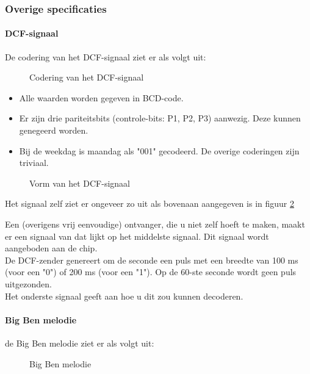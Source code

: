 \subsubsection{Overige specificaties}

\paragraph{DCF-signaal}

De codering van het DCF-signaal ziet er als volgt uit:

\begin{figure}[bth]
\centerline{}
\caption{Codering van het DCF-signaal}
\label{dcfcode}
\end{figure}

\begin{itemize}
\item
Alle waarden worden gegeven in BCD-code.
\item
Er zijn drie pariteitsbits (controle-bits: P1, P2, P3) aanwezig. Deze kunnen 
genegeerd worden.
\item
Bij de weekdag is maandag als "001" gecodeerd. De overige coderingen zijn 
triviaal.
\end{itemize}
\begin{figure}[bth]
\centerline{}
\caption{Vorm van het DCF-signaal}
\label{dcfsignaal}
\end{figure}


Het signaal zelf ziet er ongeveer zo uit als bovenaan aangegeven is in figuur 
\ref{dcfsignaal}

Een (overigens vrij eenvoudige) ontvanger, die u niet zelf hoeft te maken, maakt
 er een signaal van dat lijkt op het middelste signaal. Dit signaal wordt 
aangeboden aan de chip.\\
De DCF-zender genereert om de seconde een puls
met een breedte van 100 ms (voor een "0") of 200 ms (voor een "1").
Op de 60-ste seconde wordt geen puls uitgezonden.\\
Het onderste signaal geeft aan hoe u dit zou kunnen decoderen.

\paragraph{Big Ben melodie}

de Big Ben melodie ziet er als volgt uit:\\


\begin{figure}[bth]
\centerline{}
\caption{Big Ben melodie}
\label{Big_Ben}
\end{figure}


